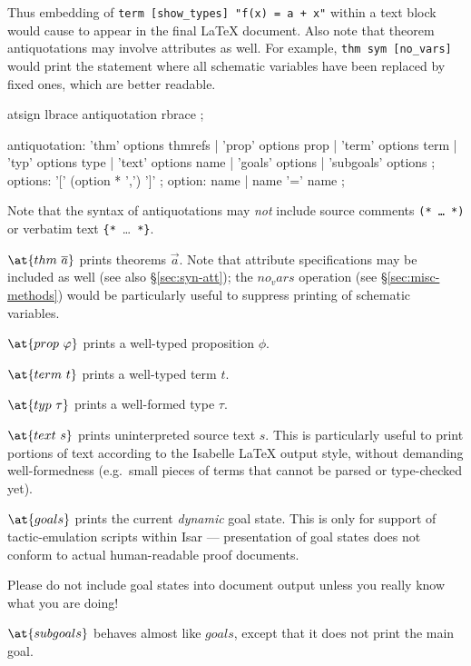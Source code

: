 Thus embedding of
\texttt{{\at}{\ttlbrace}term~[show_types]~"f(x)~=~a~+~x"{\ttrbrace}} within a
text block would cause
to appear in the final {\LaTeX} document.  Also note that theorem
antiquotations may involve attributes as well.  For example,
\texttt{{\at}{\ttlbrace}thm~sym~[no_vars]{\ttrbrace}} would print the
statement where all schematic variables have been replaced by fixed ones,
which are better readable.

\begin{rail}
  atsign lbrace antiquotation rbrace
  ;

  antiquotation:
    'thm' options thmrefs |
    'prop' options prop |
    'term' options term |
    'typ' options type |
    'text' options name |
    'goals' options |
    'subgoals' options
  ;
  options: '[' (option * ',') ']'
  ;
  option: name | name '=' name
  ;
\end{rail}

Note that the syntax of antiquotations may \emph{not} include source comments
\texttt{(*~\dots~*)} or verbatim text \verb|{*|~\dots~\verb|*}|.

\begin{descr}
\item [$\at\{thm~\vec a\}$] prints theorems $\vec a$. Note that attribute
  specifications may be included as well (see also \S\ref{sec:syn-att}); the
  $no_vars$ operation (see \S\ref{sec:misc-methods}) would be particularly
  useful to suppress printing of schematic variables.
\item [$\at\{prop~\phi\}$] prints a well-typed proposition $\phi$.
\item [$\at\{term~t\}$] prints a well-typed term $t$.
\item [$\at\{typ~\tau\}$] prints a well-formed type $\tau$.
\item [$\at\{text~s\}$] prints uninterpreted source text $s$.  This is
  particularly useful to print portions of text according to the Isabelle
  {\LaTeX} output style, without demanding well-formedness (e.g.\ small pieces
  of terms that cannot be parsed or type-checked yet).
\item [$\at\{goals\}$] prints the current \emph{dynamic} goal state.  This is
  only for support of tactic-emulation scripts within Isar --- presentation of
  goal states does not conform to actual human-readable proof documents.
  
  Please do not include goal states into document output unless you really
  know what you are doing!
\item [$\at\{subgoals\}$] behaves almost like $goals$, except that it does not
  print the main goal.
\end{descr}

